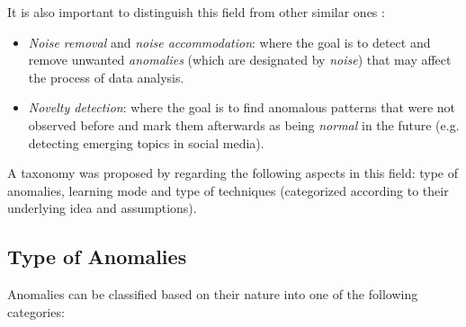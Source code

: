 It is also important to distinguish this field from other similar ones \cite{Kandhari2009}:
\begin{itemize}
	\item \textit{Noise removal} and \textit{noise accommodation}: where the goal is to detect and remove unwanted \textit{anomalies} (which are designated by \textit{noise}) that may affect the process of data analysis.
	
	\item \textit{Novelty detection}: where the goal is to find anomalous patterns that were not observed before and mark them afterwards as being \textit{normal} in the future (e.g. detecting emerging topics in social media).
\end{itemize}



A taxonomy was proposed by \textcite{Kandhari2009} regarding the following aspects in this field: type of anomalies, learning mode and type of techniques (categorized according to their underlying idea and assumptions).

\subsection{Type of Anomalies} \label{sec:anomaly_type}

Anomalies can be classified based on their nature into one of the following categories:

